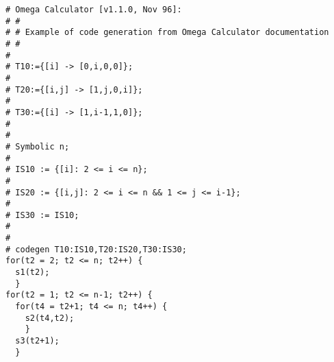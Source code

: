 \begin{verbatim}
# Omega Calculator [v1.1.0, Nov 96]:
# #
# # Example of code generation from Omega Calculator documentation
# #
# 
# T10:={[i] -> [0,i,0,0]};
# 
# T20:={[i,j] -> [1,j,0,i]};
# 
# T30:={[i] -> [1,i-1,1,0]};
# 
# 
# Symbolic n;
# 
# IS10 := {[i]: 2 <= i <= n};
# 
# IS20 := {[i,j]: 2 <= i <= n && 1 <= j <= i-1};
# 
# IS30 := IS10;
# 
# 
# codegen T10:IS10,T20:IS20,T30:IS30;
for(t2 = 2; t2 <= n; t2++) {
  s1(t2);
  }
for(t2 = 1; t2 <= n-1; t2++) {
  for(t4 = t2+1; t4 <= n; t4++) {
    s2(t4,t2);
    }
  s3(t2+1);
  }

\end{verbatim}
